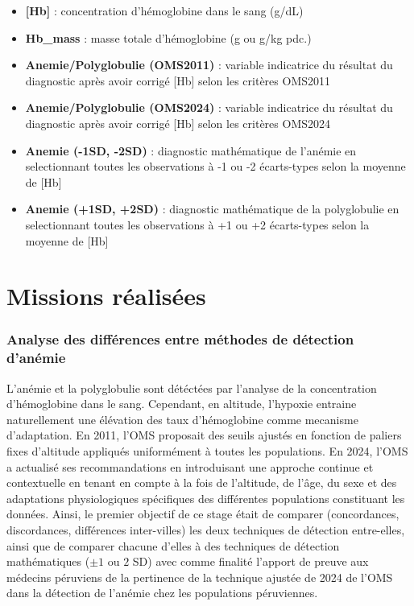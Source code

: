 \documentclass[12pt,a4paper]{article}
\begin{document}
\begin{itemize}
  \item \textbf{[Hb]} : concentration d’hémoglobine dans le sang (g/dL)
  \item \textbf{Hb\_mass} : masse totale d’hémoglobine (g ou g/kg pdc.)
  \item \textbf{Anemie/Polyglobulie (OMS2011)} : variable indicatrice du résultat du diagnostic après avoir corrigé [Hb] selon les critères OMS2011
  \item \textbf{Anemie/Polyglobulie (OMS2024)} : variable indicatrice du résultat du diagnostic après avoir corrigé [Hb] selon les critères OMS2024
  \item \textbf{Anemie (-1SD, -2SD)} : diagnostic mathématique de l'anémie en selectionnant toutes les observations à -1 ou -2 écarts-types selon la moyenne de [Hb]
  \item \textbf{Anemie (+1SD, +2SD)} : diagnostic mathématique de la polyglobulie en selectionnant toutes les observations à +1 ou +2 écarts-types selon la moyenne de [Hb]
\end{itemize}

\section{Missions réalisées}

\subsubsection{Analyse des différences entre méthodes de détection d'anémie}

L'anémie et la polyglobulie sont détéctées par l'analyse de la concentration d'hémoglobine dans le sang. Cependant, en altitude, l'hypoxie entraine naturellement une élévation des taux d'hémoglobine comme mecanisme d'adaptation. En 2011, l'OMS proposait des seuils ajustés en fonction de paliers fixes d'altitude appliqués uniformément à toutes les populations. En 2024, l'OMS a actualisé ses recommandations en introduisant une approche continue et contextuelle en tenant en compte à la fois de l'altitude, de l'âge, du sexe et des adaptations physiologiques spécifiques des différentes populations constituant les données.
Ainsi, le premier objectif de ce stage était de comparer (concordances, discordances, différences inter-villes) les deux techniques de détection entre-elles, ainsi que de comparer chacune d'elles à des techniques de détection mathématiques ($\pm 1$ ou $2$ SD) avec comme finalité l'apport de preuve aux médecins péruviens de la pertinence de la technique ajustée de 2024 de l'OMS dans la détection de l'anémie chez les populations péruviennes.
\end{document}
